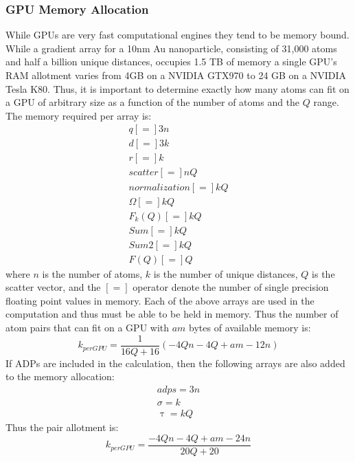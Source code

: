 \subsubsection{GPU Memory Allocation}
While GPUs are very fast computational engines they tend to be memory bound.
While a gradient array for a 10nm Au nanoparticle, consisting of 31,000 atoms and half a billion unique distances, occupies 1.5 TB of memory a single GPU's RAM allotment varies from 4GB on a NVIDIA GTX970 to 24 GB on a NVIDIA Tesla K80.
Thus, it is important to determine exactly how many atoms can fit on a GPU of arbitrary size as a function of the number of atoms and the $Q$ range.
The memory required per array is:
\begin{eqnarray}
    q [=] 3n\\
    d [=] 3k\\
    r [=] k\\
    scatter [=] nQ\\
    normalization [=] kQ\\
    \Omega [=] kQ\\
    F_{k}(Q) [=] kQ\\
    Sum [=] kQ\\
    Sum2 [=] kQ\\
    F(Q) [=] Q
\end{eqnarray}
where $n$ is the number of atoms, $k$ is the number of unique distances, $Q$ is the scatter vector, and the $[=]$ operator denote the number of single precision floating point values in memory.
Each of the above arrays are used in the computation and thus must be able to be held in memory.
Thus the number of atom pairs that can fit on a GPU with $am$ bytes of available memory is:
\begin{equation}
    k_{per GPU} = \frac{1}{16 Q + 16} \left(- 4 Q n - 4 Q + am - 12 n\right)
\end{equation}
If ADPs are included in the calculation, then the following arrays are also added to the memory allocation:
\begin{eqnarray}
    adps = 3n\\
    \sigma = k\\
    \uptau = kQ
\end{eqnarray}
Thus the pair allotment is:
\begin{equation}
    k_{per GPU} = \frac{- 4 Q n - 4 Q + am - 24 n}{20 Q + 20}
\end{equation}

